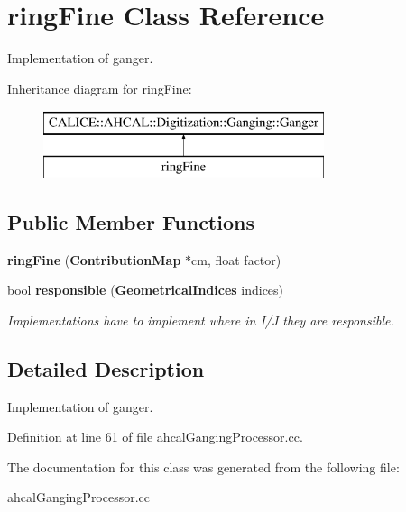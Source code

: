 \section{ring\-Fine Class Reference}
\label{classringFine}


Implementation of ganger.  


Inheritance diagram for ring\-Fine\-:\begin{figure}[H]
\begin{center}
\leavevmode
\includegraphics[height=2.000000cm]{classringFine}
\end{center}
\end{figure}
\subsection*{Public Member Functions}
\begin{DoxyCompactItemize}
\item 
{\bfseries ring\-Fine} ({\bf Contribution\-Map} $\ast$cm, float factor)\label{classringFine_ab81a07c350ce3b1a4b0ace414f616f8a}

\item 
bool {\bf responsible} ({\bf Geometrical\-Indices} indices)\label{classringFine_a17303f8b6005ba65a381161aa632ff29}

\begin{DoxyCompactList}\small\item\em Implementations have to implement where in I/\-J they are responsible. \end{DoxyCompactList}\end{DoxyCompactItemize}


\subsection{Detailed Description}
Implementation of ganger. 

Definition at line 61 of file ahcal\-Ganging\-Processor.\-cc.



The documentation for this class was generated from the following file\-:\begin{DoxyCompactItemize}
\item 
ahcal\-Ganging\-Processor.\-cc\end{DoxyCompactItemize}
